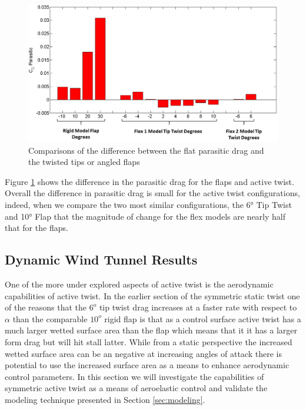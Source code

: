 \documentclass[11pt]{ucthesis}
\begin{document}
\begin{figure}[thpb]
\centering
\includegraphics[width=.75\linewidth]{Figures/CdPDiffCompare.png}
\caption{Comparisons of the difference between the flat parasitic drag and the twisted tips or angled flaps}
\label{fig:parasiticDiff}
\end{figure}


Figure \ref{fig:parasiticDiff} shows the difference in the parasitic drag for the flaps and active twist. Overall the difference in parasitic drag is small for the active twist configurations, indeed, when we compare the two most similar configurations, the 6° Tip Twist and 10° Flap that the magnitude of change for the flex models are nearly half that for the flaps.

\subsection{Dynamic Wind Tunnel Results}
\label{sec:DWTR}

One of the more under explored aspects of active twist is the aerodynamic capabilities of active twist. In the earlier section of the symmetric static twist one of the reasons that the $6^o$ tip twist drag increases at a faster rate with respect to $\alpha$ than the comparable $10^o$ rigid flap is that as a control surface active twist has a much larger wetted surface area than the flap which means that it it has a larger form drag but will hit stall latter. While from a static perspective the increased wetted surface area can be an negative at increasing angles of attack there is potential to use the increased surface area as a means to enhance aerodynamic control parameters. In this section we will investigate the capabilities of symmetric active twist as a means of aeroelastic control and validate the modeling technique presented in Section \ref{sec:modeling}.
\end{document}
